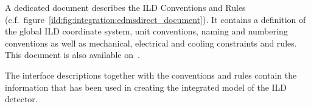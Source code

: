 A dedicated document describes the ILD Conventions and Rules (c.f.~figure~\ref{ild:fig:integration:edmsdirect_document}). It contains a definition of the global ILD coordinate system, unit conventions, naming and numbering conventions as well as mechanical, electrical and cooling constraints and rules. This document is also available on~\cite{ild:bib:edmsdirect}. 

The interface descriptions together with the conventions and rules contain the information that has been used in creating the integrated model of the ILD detector.